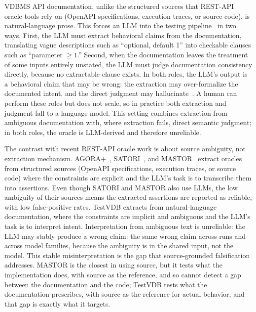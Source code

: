 \documentclass[sigconf]{acmart}
\begin{document}
VDBMS API documentation, unlike the structured sources that REST-API oracle tools rely on (OpenAPI specifications, execution traces, or source code), is natural-language prose. This forces an LLM into the testing pipeline~\cite{hou23llmse} in two ways. First, the LLM must extract behavioral claims from the documentation, translating vague descriptions such as ``optional, default 1'' into checkable clauses such as ``parameter $\geq 1$.'' Second, when the documentation leaves the treatment of some inputs entirely unstated, the LLM must judge documentation consistency directly, because no extractable clause exists. In both roles, the LLM's output is a behavioral claim that may be wrong: the extraction may over-formalize the documented intent, and the direct judgment may hallucinate~\cite{ji23hall}. A human can perform these roles but does not scale, so in practice both extraction and judgment fall to a language model. This setting combines extraction from ambiguous documentation with, where extraction fails, direct semantic judgment; in both roles, the oracle is LLM-derived and therefore unreliable.

The contrast with recent REST-API oracle work is about source ambiguity, not extraction mechanism. AGORA+~\cite{agoraplus25}, SATORI~\cite{satori25}, and MASTOR~\cite{mastor26} extract oracles from structured sources (OpenAPI specifications, execution traces, or source code) where the constraints are explicit and the LLM's task is to transcribe them into assertions. Even though SATORI and MASTOR also use LLMs, the low ambiguity of their sources means the extracted assertions are reported as reliable, with low false-positive rates. TestVDB extracts from natural-language documentation, where the constraints are implicit and ambiguous and the LLM's task is to interpret intent. Interpretation from ambiguous text is unreliable: the LLM may stably produce a wrong claim: the same wrong claim across runs and across model families, because the ambiguity is in the shared input, not the model. This stable misinterpretation is the gap that source-grounded falsification addresses. MASTOR is the closest in using source, but it tests what the implementation does, with source as the reference, and so cannot detect a gap between the documentation and the code; TestVDB tests what the documentation prescribes, with source as the reference for actual behavior, and that gap is exactly what it targets.
\end{document}
